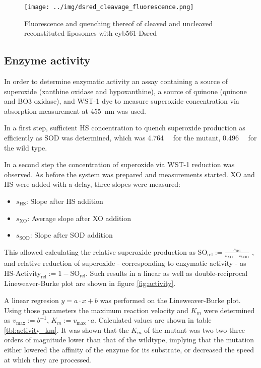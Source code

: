 \begin{figure}
	\centering
	\texttt{[image: ../img/dsred\_cleavage\_fluorescence.png]}
	\caption{Fluorescence and quenching thereof of cleaved and uncleaved reconstituted liposomes with cyb561-Dsred}
	\label{fig:dsred_cleavage_fluorescence}
\end{figure}

\subsection{Enzyme activity}

In order to determine enzymatic activity an assay containing a source of
superoxide (xanthine oxidase and hypoxanthine), a source of quinone (quinone
and BO3 oxidase), and WST-1 dye to measure superoxide concentration via
absorption measurement at \SI{455}{\nm} was used.

In a first step, sufficient HS concentration to quench superoxide production as
efficiently as SOD was determined, which was \SI{4.764}{\micro\Molar} for the
mutant, \SI{0.496}{\micro\Molar} for the wild type.

In a second step the concentration of superoxide via WST-1 reduction was
observed. As before the system was prepared and measurements started. XO and HS
were added with a delay, three slopes were measured:

\begin{itemize}
	\item $s_{\text{HS}}$: Slope after HS addition
	\item $s_{\text{XO}}$: Average slope after XO addition
	\item $s_{\text{SOD}}$: Slope after SOD addition
\end{itemize}

This allowed calculating the relative superoxide production as
$\text{SO}_{\text{rel}} := \frac{s_{\text{HS}}}{s_{\text{XO}} -
s_{\text{SOD}}}$ , and relative reduction of superoxide - corresponding to
enzymatic activity - as  $\text{HS-Activity}_{\text{rel}} := 1 -
\text{SO}_{\text{rel}}$. Such results in a linear as well as double-reciprocal
Lineweaver-Burke plot are shown in figure \ref{fig:activity}.

A linear regresion $y = a \cdot x + b$ was performed on the Lineweaver-Burke
plot. Using those parameters the maximum reaction velocity and $K_m$ were
determined as $v_\text{max} := b^{-1}$, $K_m := v_\text{max} \cdot a$.
Calculated values are shown in table \ref{tbl:activity_km}. It was shown that
the $K_m$ of the mutant was two two three orders of magnitude lower than that
of the wildtype, implying that the mutation either lowered the affinity of the
enzyme for its substrate, or decreased the speed at which they are processed.

